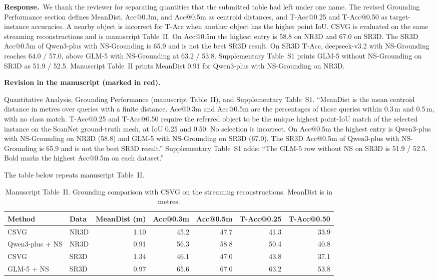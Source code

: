 \documentclass[11pt]{article}
\newcommand{\revresponse}[1]{%
  \par\noindent\textbf{Response.}\ #1\par\vspace{0.3em}}
\newcommand{\revchange}[1]{%
  \par\noindent\textbf{Revision in the manuscript (marked in red).}\par
  \noindent\textcolor{revred}{#1}\par\vspace{0.8em}}
\begin{document}
\revresponse{We thank the reviewer for separating quantities that the submitted table had left under one name. The revised Grounding Performance section defines MeanDist, Acc@0.3m, and Acc@0.5m as centroid distances, and T-Acc@0.25 and T-Acc@0.50 as target-instance accuracies. A nearby object is incorrect for T-Acc when another object has the higher point IoU. CSVG is evaluated on the same streaming reconstructions and is manuscript Table~II. On Acc@0.5m the highest entry is 58.8 on NR3D and 67.0 on SR3D. The SR3D Acc@0.5m of Qwen3-plus with NS-Grounding is 65.9 and is not the best SR3D result. On SR3D T-Acc, deepseek-v3.2 with NS-Grounding reaches 64.0 / 57.0, above GLM-5 with NS-Grounding at 63.2 / 53.8. Supplementary Table~S1 prints GLM-5 without NS-Grounding on SR3D as 51.9 / 52.5. Manuscript Table~II prints MeanDist 0.91 for Qwen3-plus with NS-Grounding on NR3D.}

\revchange{Quantitative Analysis, Grounding Performance (manuscript Table~II), and Supplementary Table~S1. ``MeanDist is the mean centroid distance in metres over queries with a finite distance. Acc@0.3m and Acc@0.5m are the percentages of those queries within 0.3\,m and 0.5\,m, with no class match. T-Acc@0.25 and T-Acc@0.50 require the referred object to be the unique highest point-IoU match of the selected instance on the ScanNet ground-truth mesh, at IoU 0.25 and 0.50. No selection is incorrect. On Acc@0.5m the highest entry is Qwen3-plus with NS-Grounding on NR3D (58.8) and GLM-5 with NS-Grounding on SR3D (67.0). The SR3D Acc@0.5m of Qwen3-plus with NS-Grounding is 65.9 and is not the best SR3D result.'' Supplementary Table~S1 adds: ``The GLM-5 row without NS on SR3D is 51.9 / 52.5. Bold marks the highest Acc@0.5m on each dataset.''}

\noindent The table below repeats manuscript Table~II.

\begin{table}[ht]
\centering
\caption{Manuscript Table~II. Grounding comparison with CSVG on the streaming reconstructions. MeanDist is in metres.}
\label{tab:csvg}
\small
\begin{tabular}{llrrrrr}
\toprule
Method & Data & MeanDist (m) & Acc@0.3m & Acc@0.5m & T-Acc@0.25 & T-Acc@0.50 \\
\midrule
CSVG & NR3D & 1.10 & 45.2 & 47.7 & 41.3 & 33.9 \\
Qwen3-plus + NS & NR3D & 0.91 & 56.3 & 58.8 & 50.4 & 40.8 \\
CSVG & SR3D & 1.34 & 46.1 & 47.0 & 43.8 & 37.1 \\
GLM-5 + NS & SR3D & 0.97 & 65.6 & 67.0 & 63.2 & 53.8 \\
\bottomrule
\end{tabular}
\end{table}
\end{document}
